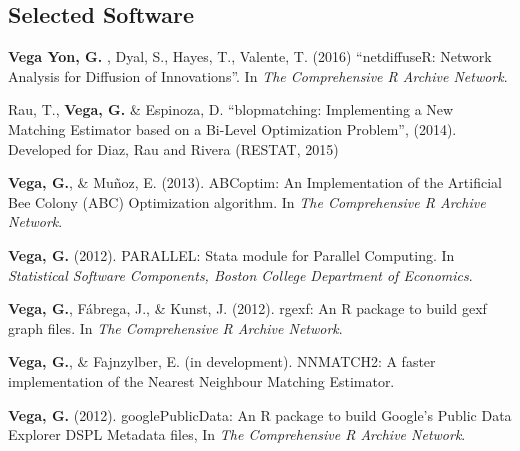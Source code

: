 \documentclass[letterpaper, 11pt]{article}
\renewenvironment{itemize}{
  \begin{list}{}{
    \setlength{\leftmargin}{0.45cm}
  }
}{
  \end{list}
}
\begin{document}
\subsection*{Selected Software}
\begin{itemize}
\item {\bf Vega Yon, G.} , Dyal, S., Hayes, T., Valente, T. (2016) ``netdiffuseR: Network Analysis for Diffusion of Innovations''. In {\it The Comprehensive R Archive Network}.
\item Rau, T., {\bf Vega, G.} \& Espinoza, D. ``blopmatching: Implementing a New Matching Estimator based on a Bi-Level Optimization Problem'', (2014). Developed for Diaz, Rau and Rivera (RESTAT, 2015)
\item {\bf Vega, G.}, \& Mu\~noz, E. (2013). ABCoptim: An Implementation of the Artificial Bee Colony (ABC) Optimization algorithm. In {\it The Comprehensive R Archive Network}.
\item {\bf Vega, G.} (2012). PARALLEL: Stata module for Parallel Computing. In {\it Statistical Software Components, Boston College Department of Economics}.
\item {\bf Vega, G.}, F\'abrega, J., \& Kunst, J. (2012). rgexf: An R package to build gexf graph files. In {\it The Comprehensive R Archive Network}.
\item {\bf Vega, G.}, \& Fajnzylber, E. (in development). NNMATCH2: A faster implementation of the Nearest Neighbour Matching Estimator.
\item {\bf Vega, G.} (2012). googlePublicData: An R package to build Google's Public Data Explorer DSPL Metadata files, In {\it The Comprehensive R Archive Network}.
\end{itemize}

%
\end{document}
